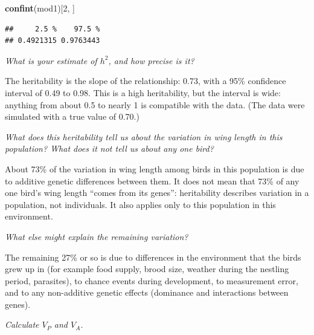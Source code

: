 \documentclass[
  a4paper]{book}
\newenvironment{Shaded}{\begin{snugshade}}{\end{snugshade}}
\newcommand{\DecValTok}[1]{\textcolor[rgb]{0.00,0.00,0.81}{#1}}
\newcommand{\FunctionTok}[1]{\textcolor[rgb]{0.13,0.29,0.53}{\textbf{#1}}}
\newcommand{\NormalTok}[1]{#1}
\newcommand{\OtherTok}[1]{\textcolor[rgb]{0.56,0.35,0.01}{#1}}
\newcommand{\SpecialCharTok}[1]{\textcolor[rgb]{0.81,0.36,0.00}{\textbf{#1}}}
\begin{document}
\begin{Shaded}
\begin{Highlighting}[]
\FunctionTok{confint}\NormalTok{(mod1)[}\DecValTok{2}\NormalTok{, ]}
\end{Highlighting}
\end{Shaded}

\begin{verbatim}
##     2.5 %    97.5 % 
## 0.4921315 0.9763443
\end{verbatim}

\emph{What is your estimate of \(h^2\), and how precise is it?}

The heritability is the slope of the relationship: 0.73, with a 95\% confidence interval of 0.49 to 0.98. This is a high heritability, but the interval is wide: anything from about 0.5 to nearly 1 is compatible with the data. (The data were simulated with a true value of 0.70.)

\emph{What does this heritability tell us about the variation in wing length in this population? What does it not tell us about any one bird?}

About 73\% of the variation in wing length among birds in this population is due to additive genetic differences between them. It does not mean that 73\% of any one bird's wing length ``comes from its genes'': heritability describes variation in a population, not individuals. It also applies only to this population in this environment.

\emph{What else might explain the remaining variation?}

The remaining 27\% or so is due to differences in the environment that the birds grew up in (for example food supply, brood size, weather during the nestling period, parasites), to chance events during development, to measurement error, and to any non-additive genetic effects (dominance and interactions between genes).

\emph{Calculate \(V_P\) and \(V_A\).}

\begin{Shaded}
\end{Shaded}
\end{document}
